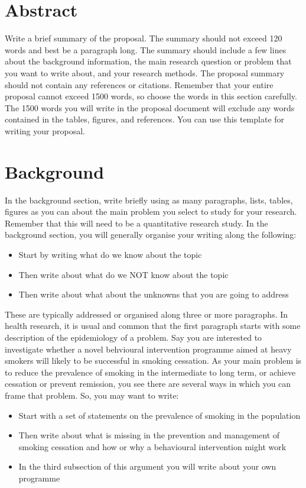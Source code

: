 \section*{Abstract}

Write a brief summary of the proposal. The summary should not exceed 120 words and best be a paragraph long. The summary should include a few lines about the background information, the main research question or problem that you want to write about, and your research methods. The proposal summary should not contain any references or citations. Remember that your entire proposal cannot exceed 1500 words, so choose the words in this section carefully. The 1500 words you will write in the proposal document will exclude any words contained in the tables, figures, and references. You can use this template for writing your proposal. 

\section*{Background}

In the background section, write briefly using as many paragraphs, lists, tables, figures as you can about the main problem you select to study for your research. Remember that this will need to be a quantitative research study. In the background section, you will generally organise your writing along the following:

\begin{itemize}
	\item Start by writing what do we know about the topic
	\item Then write about what do we NOT know about the topic 
	\item Then write about what about the unknowns that you are going to address
\end{itemize}

These are typically addressed or organised along three or more paragraphs. In health research, it is usual and common that the first paragraph starts with some description of the epidemiology of a problem. Say you are interested to investigate whether a novel behvioural intervention programme aimed at heavy smokers will likely to be successful in smoking cessation. As your main problem is to reduce the prevalence of smoking in the intermediate to long term, or achieve cessation or prevent remission, you see there are several ways in which you can frame that problem. So, you may want to write:

\begin{itemize}
	\item Start with a set of statements on the prevalence of smoking in the population
	\item Then write about what is missing in the prevention and management of smoking cessation and how or why a behavioural intervention might work
	\item In the third subsection of this argument you will write about your own programme
\end{itemize}

